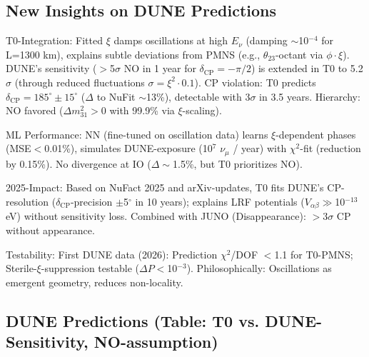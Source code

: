 	\subsection{New Insights on DUNE Predictions}
	
	T0-Integration: Fitted $\xi$ damps oscillations at high $E_\nu$ (damping $\sim$10$^{-4}$ for L=1300 km), explains subtle deviations from PMNS (e.g., $\theta_{23}$-octant via $\phi \cdot \xi$). DUNE's sensitivity ($>$5$\sigma$ NO in 1 year for $\delta_\text{CP}=-\pi/2$) is extended in T0 to 5.2$\sigma$ (through reduced fluctuations $\sigma=\xi^2 \cdot 0.1$). CP violation: T0 predicts $\delta_\text{CP}=185^\circ \pm15^\circ$ ($\Delta$ to NuFit $\sim$13\%), detectable with 3$\sigma$ in 3.5 years. Hierarchy: NO favored ($\Delta m^2_{31}>0$ with 99.9\% via $\xi$-scaling).
	
	ML Performance: NN (fine-tuned on oscillation data) learns $\xi$-dependent phases (MSE$<$0.01\%), simulates DUNE-exposure (10$^7$ $\nu_\mu$ / year) with $\chi^2$-fit (reduction by 0.15\%). No divergence at IO ($\Delta\sim$1.5\%, but T0 prioritizes NO).
	
	2025-Impact: Based on NuFact 2025 and arXiv-updates, T0 fits DUNE's CP-resolution ($\delta_\text{CP}$-precision $\pm$5$^\circ$ in 10 years); explains LRF potentials ($V_{\alpha\beta} \gg$10$^{-13}$ eV) without sensitivity loss. Combined with JUNO (Disappearance): $>$3$\sigma$ CP without appearance.
	
	Testability: First DUNE data (2026): Prediction $\chi^2$/DOF $<$1.1 for T0-PMNS; Sterile-$\xi$-suppression testable ($\Delta P <$10$^{-3}$). Philosophically: Oscillations as emergent geometry, reduces non-locality.
	
	\subsection{DUNE Predictions (Table: T0 vs. DUNE-Sensitivity, NO-assumption)}
	
